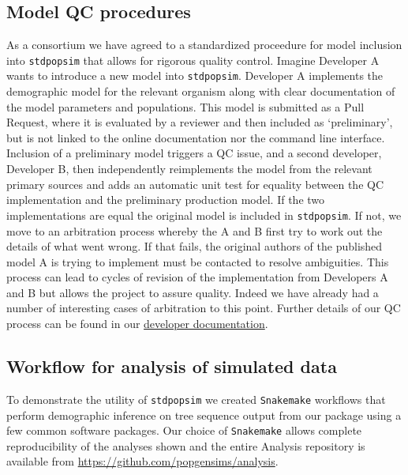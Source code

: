 \documentclass[12pt,halfline,a4paper]{ouparticle}
\newcommand{\stdpopsim}{\texttt{stdpopsim}\xspace}
\begin{document}
\subsection*{Model QC procedures}
As a consortium we have agreed to a standardized proceedure for model inclusion
into \stdpopsim that allows for rigorous quality control. Imagine Developer A
wants to introduce a new model into \stdpopsim. Developer A implements the
demographic model for the relevant organism along with clear documentation
of the model parameters and populations. This model is submitted as a Pull Request,
where it is evaluated by a reviewer and then included as `preliminary',
but is not linked to the online documentation nor the command line interface.
Inclusion of a preliminary model triggers a QC issue, and a second developer,
Developer B, then independently reimplements the model from the relevant
primary sources and adds an automatic unit test for equality between the
QC implementation and the preliminary production model. If the two
implementations are equal the original model is included in \stdpopsim.
If not, we move to an arbitration process whereby the A and B first try
to work out the details of what went wrong. If that fails, the original
authors of the published model A is trying to implement must be contacted
to resolve ambiguities. This process can lead to cycles of revision of
the implementation from Developers A and B but allows the project to assure
quality. Indeed we have already had a number of interesting cases of arbitration
to this point. Further details of our QC process can be found in our
\href{https://stdpopsim.readthedocs.io/en/latest/development.html#}{developer documentation}.

\subsection*{Workflow for analysis of simulated data}
To demonstrate the utility of \stdpopsim we created \texttt{Snakemake}
workflows \citep{koster2012snakemake} that perform demographic inference on
tree sequence output from our package using a few common software packages. 
Our choice of \texttt{Snakemake} allows complete reproducibility of the 
analyses shown and the entire Analysis repository is available from
\url{https://github.com/popgensims/analysis}. 
\end{document}
